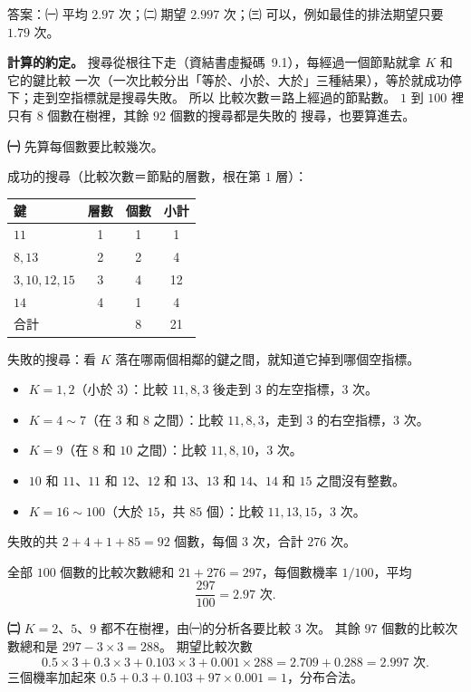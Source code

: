 \begin{pastsoln}
答案：㈠ 平均 $2.97$ 次；㈡ 期望 $2.997$ 次；㈢ 可以，例如最佳的排法期望只要 $1.79$ 次。

\textbf{計算的約定。} 搜尋從根往下走（資結書虛擬碼~9.1），每經過一個節點就拿 $K$ 和它的鍵比較
一次（一次比較分出「等於、小於、大於」三種結果），等於就成功停下；走到空指標就是搜尋失敗。 所以
比較次數＝路上經過的節點數。 $1$ 到 $100$ 裡只有 $8$ 個數在樹裡，其餘 $92$ 個數的搜尋都是失敗的
搜尋，也要算進去。

\textbf{㈠} 先算每個數要比較幾次。

成功的搜尋（比較次數＝節點的層數，根在第 $1$ 層）：
\begin{center}
\begin{tabular}{lccc}
\toprule
鍵 & 層數 & 個數 & 小計 \\
\midrule
$11$ & 1 & 1 & 1 \\
$8, 13$ & 2 & 2 & 4 \\
$3, 10, 12, 15$ & 3 & 4 & 12 \\
$14$ & 4 & 1 & 4 \\
\midrule
合計 & & 8 & 21 \\
\bottomrule
\end{tabular}
\end{center}

失敗的搜尋：看 $K$ 落在哪兩個相鄰的鍵之間，就知道它掉到哪個空指標。
\begin{itemize}
\item $K = 1, 2$（小於 $3$）：比較 $11, 8, 3$ 後走到 $3$ 的左空指標，$3$ 次。
\item $K = 4 \sim 7$（在 $3$ 和 $8$ 之間）：比較 $11, 8, 3$，走到 $3$ 的右空指標，$3$ 次。
\item $K = 9$（在 $8$ 和 $10$ 之間）：比較 $11, 8, 10$，$3$ 次。
\item $10$ 和 $11$、$11$ 和 $12$、$12$ 和 $13$、$13$ 和 $14$、$14$ 和 $15$ 之間沒有整數。
\item $K = 16 \sim 100$（大於 $15$，共 $85$ 個）：比較 $11, 13, 15$，$3$ 次。
\end{itemize}
失敗的共 $2 + 4 + 1 + 85 = 92$ 個數，每個 $3$ 次，合計 $276$ 次。

全部 $100$ 個數的比較次數總和 $21 + 276 = 297$，每個數機率 $1/100$，平均
\[
\frac{297}{100} = 2.97 \text{ 次}.
\]

\textbf{㈡} $K = 2$、$5$、$9$ 都不在樹裡，由㈠的分析各要比較 $3$ 次。 其餘 $97$ 個數的比較次數總和是
$297 - 3 \times 3 = 288$。 期望比較次數
\[
0.5 \times 3 + 0.3 \times 3 + 0.103 \times 3 + 0.001 \times 288
= 2.709 + 0.288 = 2.997 \text{ 次}.
\]
三個機率加起來 $0.5 + 0.3 + 0.103 + 97 \times 0.001 = 1$，分布合法。


\end{pastsoln}
